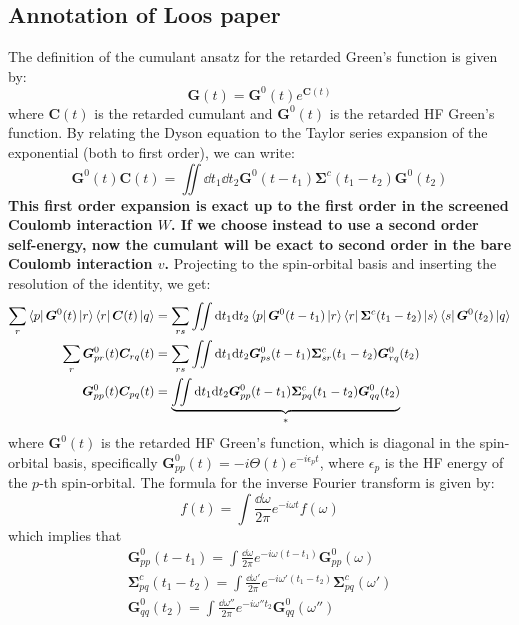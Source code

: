 \subsection{Annotation of Loos paper}
The definition of the cumulant ansatz for the retarded Green's function is given by:
\begin{equation}
    \bm{G}(t) = \bm{G}^0(t)e^{\bm{C}(t)}
\end{equation}
where $\bm{C}(t)$ is the retarded cumulant and $\bm{G}^0(t)$ is the retarded HF Green's function. By relating the Dyson equation to the Taylor series expansion of the exponential (both to first order), we can write:
\begin{equation}
    \bm{G}^0(t) \bm{C}(t) = \iint \dd t_1 \dd t_2 \bm{G}^0(t-t_1) \bm{\Sigma}^c(t_1 - t_2) \bm{G}^0(t_2)
\end{equation}
\textbf{This first order expansion is exact up to the first order in the screened Coulomb interaction $W$. If we choose instead to use a second order self-energy, now the cumulant will be exact to second order in the bare Coulomb interaction $v$.}
Projecting to the spin-orbital basis and inserting the resolution of the identity, we get:
\begin{align}
    \sum_{r}\bra{p}\bm{G}^0(t) \ket{r}\bra{r}\bm{C}(t)\ket{q} &= \sum_{rs}\iint \dd t_1 \dd t_2 \bra{p}\bm{G}^0(t-t_1)\ket{r} \bra{r}\bm{\Sigma}^c(t_1 - t_2)\ket{s} \bra{s}\bm{G}^0(t_2)\ket{q} \\
    \sum_{r}\bm{G}_{pr}^0(t) \bm{C}_{rq}(t) &= \sum_{rs}\iint \dd t_1 \dd t_2 \bm{G}_{ps}^0(t-t_1) \bm{\Sigma}_{sr}^c(t_1 - t_2) \bm{G}_{rq}^0(t_2)\\
    \bm{G}_{pp}^{0}(t) \bm{C}_{pq}(t) &= \underbrace{\iint \dd t_1 \dd t_2 \bm{G}_{pp}^{0}(t-t_1) \bm{\Sigma}_{pq}^c(t_1 - t_2) \bm{G}_{qq}^{0}(t_2)}_{*}
    \label{eqn:cumulant_connection}
\end{align}
where $\bm{G}^0(t)$ is the retarded HF Green's function, which is diagonal in the spin-orbital basis, specifically $\bm{G}_{pp}^{0}(t) = -i\Theta(t)e^{-i\epsilon_p t}$, where $\epsilon_p$ is the HF energy of the $p$-th spin-orbital.
The formula for the inverse Fourier transform is given by:
\begin{equation}
    f(t) = \int \frac{\dd \omega}{2\pi} e^{-i\omega t} f(\omega)
\end{equation}
which implies that
\begin{align}
    \bm{G}_{pp}^{0}(t-t_1) = \int \frac{\dd \omega}{2\pi} e^{-i\omega (t-t_1)} \bm{G}_{pp}^{0}(\omega)\\
    \bm{\Sigma}_{pq}^c(t_1 - t_2) = \int \frac{\dd \omega'}{2\pi} e^{-i\omega' (t_1 - t_2)} \bm{\Sigma}_{pq}^c(\omega')\\
    \bm{G}_{qq}^{0}(t_2) = \int \frac{\dd \omega''}{2\pi} e^{-i\omega'' t_2} \bm{G}_{qq}^{0}(\omega'')
\end{align}
